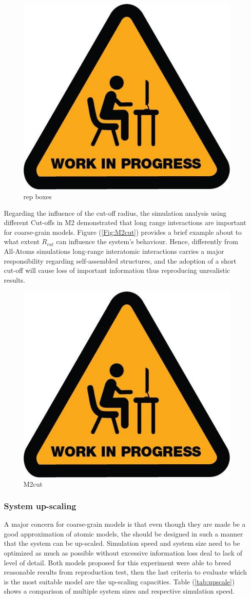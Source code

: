 \documentclass[10pt,a4paper,twoside]{article}
\begin{document}
   

     \begin{figure}[ht!]
  \begin{center}
	\includegraphics[width=0.4 \textwidth]{./images/wip}
	\caption{rep boxes}
	\label{Fig:M1M2box}
  \end{center}
\end{figure}

Regarding the influence of the cut-off radius, the simulation analysis using different Cut-offs in M2 demonstrated that long range interactions are important for coarse-grain models. Figure (\ref{Fig:M2cut}) provides a brief example about to what extent  $R_{cut}$ can influence the system's behaviour. Hence, differently from All-Atoms simulations long-range interatomic interactions carries a major responsibility regarding self-assembled structures, and the adoption of a short cut-off will cause loss of important information thus reproducing unrealistic results.

 \begin{figure}[ht!]
  \begin{center}
	\includegraphics[width=0.4 \textwidth]{./images/wip}
	\caption{M2cut}
	\label{Fig:M1M2box}
  \end{center}
\end{figure}

\subsubsection*{System up-scaling}

A major concern for coarse-grain models is that even though they are made be a good approximation of atomic models, the should be designed in such a manner that the system can be up-scaled. Simulation speed and system size need to be optimized as much as possible without excessive information loss deal to lack of level of detail. Both models proposed for this experiment were able to breed reasonable results from reproduction test, then the last criteria to evaluate which is the most suitable model are the up-scaling capacities. Table (\ref{tab:upscale}) shows a comparison of multiple system sizes and respective simulation speed.
\end{document}
